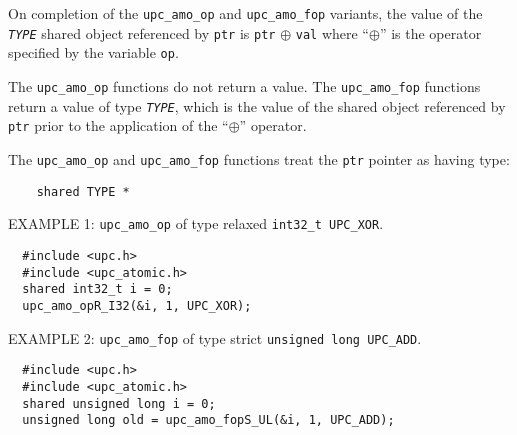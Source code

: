 \np On completion of the {\tt upc\_amo\_op} and {\tt upc\_amo\_fop} variants,
    the value of the {\tt{\em TYPE}} shared object referenced by {\tt ptr} is 
    {\tt *ptr} $\oplus$ {\tt val} where ``$\oplus$'' is the operator
    specified by the variable {\tt op}.

\np The {\tt upc\_amo\_op} functions do not return a value.  The
    {\tt upc\_amo\_fop} functions return a value of type {\tt{\em TYPE}}, which
    is the value of the shared object referenced by {\tt ptr} prior to the
    application of the ``$\oplus$'' operator.

\np The {\tt upc\_amo\_op} and {\tt upc\_amo\_fop} functions treat the
    {\tt ptr} pointer as having type:
\begin{verbatim}
    shared TYPE *
\end{verbatim}

\np EXAMPLE 1: {\tt upc\_amo\_op} of type relaxed {\tt int32\_t UPC\_XOR}.
\begin{verbatim}
  #include <upc.h>
  #include <upc_atomic.h>
  shared int32_t i = 0;
  upc_amo_opR_I32(&i, 1, UPC_XOR);
\end{verbatim}

\np EXAMPLE 2: {\tt upc\_amo\_fop} of type strict {\tt unsigned long UPC\_ADD}.
\begin{verbatim}
  #include <upc.h>
  #include <upc_atomic.h>
  shared unsigned long i = 0;
  unsigned long old = upc_amo_fopS_UL(&i, 1, UPC_ADD);
\end{verbatim}
